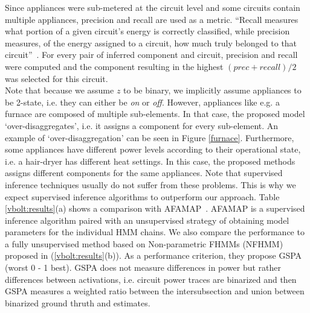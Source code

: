 Since appliances were sub-metered at the circuit level and some circuits contain multiple appliances, precision and recall are used as a metric. ``Recall measures what portion of a given circuit’s energy is correctly classified, while precision measures, of the energy assigned to a circuit, how much truly belonged to that circuit''~\cite{kolter2012fhmm}. For every pair of inferred component and circuit, precision and recall were computed and the component resulting in the highest $(prec + recall)/2$ was selected for this circuit.\\
Note that because we assume $z$ to be binary, we implicitly assume appliances to be 2-state, i.e. they can either be \emph{on} or \emph{off}. However, appliances like e.g. a furnace are composed of multiple sub-elements. In that case, the proposed model `over-disaggregates', i.e. it assigns a component for every sub-element. An example of `over-disaggregation' can be seen in Figure \ref{furnace}. Furthermore, some appliances have different power levels according to their operational state, i.e. a hair-dryer has different heat settings. In this case, the proposed methods assigns different components for the same appliances. Note that supervised inference techniques usually do not suffer from these problems. This is why we expect supervised inference algorithms to outperform our approach. Table \ref{vbolt:results}(a) shows a comparison with AFAMAP~\cite{kolter2012fhmm}. AFAMAP is a supervised inference algorithm paired with an unsupervised strategy of obtaining model parameters for the individual HMM chains.
We also compare the performance to a fully unsupervised method based on Non-parametric FHMMs (NFHMM) proposed in \cite{jia2015fully} (\ref{vbolt:results}(b)). As a performance criterion, they propose GSPA (worst 0 - 1 best). GSPA does not measure differences in power but rather differences between activations, i.e. circuit power traces are binarized and then GSPA measures a weighted ratio between the intersubsection and union between binarized ground thruth and estimates.


